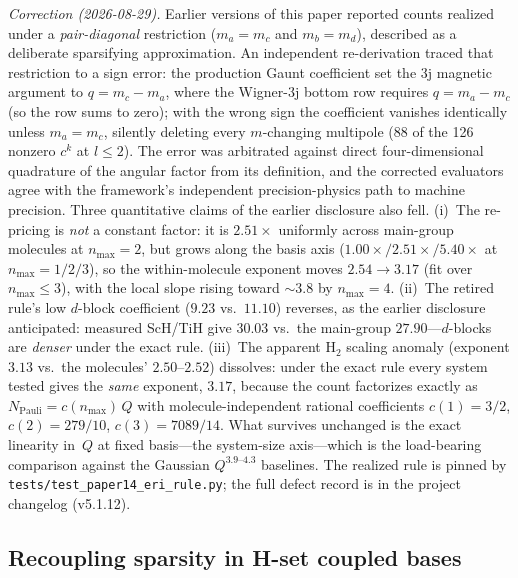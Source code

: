 \documentclass[aps,pra,twocolumn,superscriptaddress,longbibliography]{revtex4-2}
\begin{document}
\emph{Correction (2026-08-29).}  Earlier versions of this paper reported
counts realized under a \emph{pair-diagonal} restriction ($m_a = m_c$ and
$m_b = m_d$), described as a deliberate sparsifying approximation.  An
independent re-derivation traced that restriction to a sign error: the
production Gaunt coefficient set the 3j magnetic argument to
$q = m_c - m_a$, where the Wigner-3j bottom row requires
$q = m_a - m_c$ (so the row sums to zero); with the wrong sign the
coefficient vanishes identically unless $m_a = m_c$, silently deleting
every $m$-changing multipole (88 of the 126 nonzero $c^k$ at
$l \le 2$).  The error was arbitrated against direct four-dimensional
quadrature of the angular factor from its definition, and the corrected
evaluators agree with the framework's independent precision-physics path
to machine precision.  Three quantitative claims of the earlier disclosure
also fell.  (i)~The re-pricing is \emph{not} a constant factor: it is
$2.51\times$ uniformly across main-group molecules at $n_{\max} = 2$, but
grows along the basis axis ($1.00\times / 2.51\times / 5.40\times$ at
$n_{\max} = 1/2/3$), so the within-molecule exponent moves
$2.54 \to 3.17$ (fit over $n_{\max} \le 3$), with the local slope rising
toward $\sim 3.8$ by $n_{\max} = 4$.  (ii)~The retired rule's low
$d$-block coefficient ($9.23$ vs.\ $11.10$) reverses, as the earlier
disclosure anticipated: measured ScH/TiH give $30.03$ vs.\ the main-group
$27.90$---$d$-blocks are \emph{denser} under the exact rule.  (iii)~The
apparent H$_2$ scaling anomaly (exponent $3.13$ vs.\ the molecules'
$2.50$--$2.52$) dissolves: under the exact rule every system tested gives
the \emph{same} exponent, $3.17$, because the count factorizes exactly as
$N_{\mathrm{Pauli}} = c(n_{\max})\,Q$ with molecule-independent rational
coefficients $c(1) = 3/2$, $c(2) = 279/10$, $c(3) = 7089/14$.  What
survives unchanged is the exact linearity in~$Q$ at fixed basis---the
system-size axis---which is the load-bearing comparison against the
Gaussian $Q^{3.9\text{--}4.3}$ baselines.  The realized rule is pinned by
\texttt{tests/test\_paper14\_eri\_rule.py}; the full defect record is in
the project changelog (v5.1.12).

\subsection{Recoupling sparsity in H-set coupled bases}
\label{sec:recoupling_sparsity}
\end{document}
